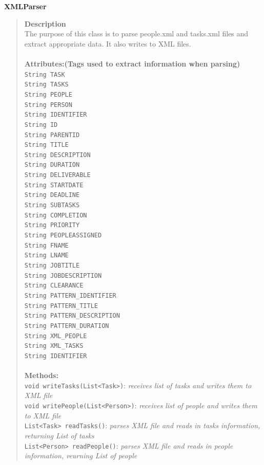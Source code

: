 \documentclass[12pt]{article}
\begin{document}
{\bf XMLParser}
\begin{quote}
{\bf Description}\\
The purpose of this class is to parse people.xml and tasks.xml files and extract appropriate data. It also writes to XML files.\\\\
{\bf Attributes:(Tags used to extract information when parsing)}\\
\texttt{String TASK}\\
\texttt{String TASKS}\\
\texttt{String PEOPLE}\\
\texttt{String PERSON}\\
\texttt{String IDENTIFIER}\\
\texttt{String ID}\\
\texttt{String PARENTID}\\
\texttt{String TITLE}\\
\texttt{String DESCRIPTION}\\
\texttt{String DURATION}\\
\texttt{String DELIVERABLE}\\
\texttt{String STARTDATE}\\
\texttt{String DEADLINE}\\
\texttt{String SUBTASKS}\\
\texttt{String COMPLETION}\\
\texttt{String PRIORITY}\\
\texttt{String PEOPLEASSIGNED}\\
\texttt{String FNAME}\\
\texttt{String LNAME}\\
\texttt{String JOBTITLE}\\
\texttt{String JOBDESCRIPTION}\\
\texttt{String CLEARANCE}\\
\texttt{String PATTERN\_IDENTIFIER}\\
\texttt{String PATTERN\_TITLE}\\
\texttt{String PATTERN\_DESCRIPTION}\\
\texttt{String PATTERN\_DURATION}\\
\texttt{String XML\_PEOPLE}\\
\texttt{String XML\_TASKS}\\
\texttt{String IDENTIFIER}\\\\
{\bf Methods:}\\
\texttt{void writeTasks(List<Task>)}: \emph{receives list of tasks and writes them to XML file}\\
\texttt{void writePeople(List<Person>)}: \emph{receives list of people and writes them to XML file}\\
\texttt{List<Task> readTasks()}: \emph{parses XML file and reads in tasks information, returning List of tasks}\\
\texttt{List<Person> readPeople()}: \emph{parses XML file and reads in people information, reurning List of people}
\end{quote}
 
\end{document}
